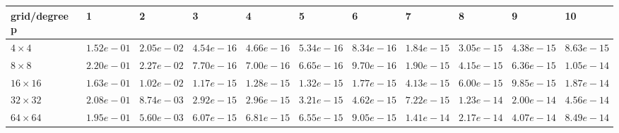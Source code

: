\begin{tabular}{lllllllllll}
\hline
 grid/degree p   & 1          & 2          & 3          & 4          & 5          & 6          & 7          & 8          & 9          & 10         \\
\hline
 $4 \times 4$    & $1.52e-01$ & $2.05e-02$ & $4.54e-16$ & $4.66e-16$ & $5.34e-16$ & $8.34e-16$ & $1.84e-15$ & $3.05e-15$ & $4.38e-15$ & $8.63e-15$ \\
 $8 \times 8$    & $2.20e-01$ & $2.27e-02$ & $7.70e-16$ & $7.00e-16$ & $6.65e-16$ & $9.70e-16$ & $1.90e-15$ & $4.15e-15$ & $6.36e-15$ & $1.05e-14$ \\
 $16 \times 16$  & $1.63e-01$ & $1.02e-02$ & $1.17e-15$ & $1.28e-15$ & $1.32e-15$ & $1.77e-15$ & $4.13e-15$ & $6.00e-15$ & $9.85e-15$ & $1.87e-14$ \\
 $32 \times 32$  & $2.08e-01$ & $8.74e-03$ & $2.92e-15$ & $2.96e-15$ & $3.21e-15$ & $4.62e-15$ & $7.22e-15$ & $1.23e-14$ & $2.00e-14$ & $4.56e-14$ \\
 $64 \times 64$  & $1.95e-01$ & $5.60e-03$ & $6.07e-15$ & $6.81e-15$ & $6.55e-15$ & $9.05e-15$ & $1.41e-14$ & $2.17e-14$ & $4.07e-14$ & $8.49e-14$ \\
\hline
\end{tabular}